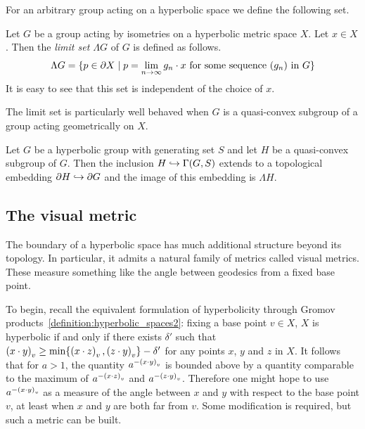 For an arbitrary group acting on a hyperbolic space we define the following set.

\begin{definition}
  Let $G$ be a group acting by isometries on a hyperbolic metric space $X$.
  Let $x \in X$.
  Then the \emph{limit set $\Lambda G$} of $G$ is defined as follows.
  \begin{align}
    \Lambda G = \{p \in \boundary X \suchthat p = \lim_{n\to\infty} g_n\cdot x\text{ for some sequence $(g_n)$ in $G$}\}
  \end{align}
  It is easy to see that this set is independent of the choice of $x$.
\end{definition}

The limit set is particularly well behaved when $G$ is a quasi-convex subgroup of a group acting geometrically on $X$.

\begin{theorem}\cite{ghysdelaharpe90}
  Let $G$ be a hyperbolic group with generating set $S$ and let $H$ be a quasi-convex subgroup of $G$.
  Then the inclusion $H \mapsinto \Cay(G, S)$ extends to a topological embedding $\boundary H \mapsinto \boundary G$ and the image of this embedding is $\Lambda H$.
\end{theorem}

\subsection{The visual metric}\label{section:visual_metric}

The boundary of a hyperbolic space has much additional structure beyond its topology.
In particular, it admits a natural family of metrics called visual metrics.
These measure something like the angle between geodesics from a fixed base point.

To begin, recall the equivalent formulation of hyperbolicity through Gromov products~\ref{definition:hyperbolic_spaces2}: fixing a base point $v \in X$, $X$ is hyperbolic if and only if there exists $\delta'$ such that $\gromprod[v]{x}{y} \geq \min\{\gromprod[v]{x}{z}, \gromprod[v]{z}{y}\} - \delta'$ for any points $x$, $y$ and $z$ in $X$.
It follows that for $a > 1$, the quantity $a^{-\gromprod[v]{x}{y}}$ is bounded above by a quantity comparable to the maximum of $a^{-\gromprod[v]{x}{z}}$ and $a^{-\gromprod[v]{z}{y}}$.
Therefore one might hope to use $a^{-\gromprod[v]{x}{y}}$ as a measure of the angle between $x$ and $y$ with respect to the base point $v$, at least when $x$ and $y$ are both far from $v$.
Some modification is required, but such a metric can be built.

